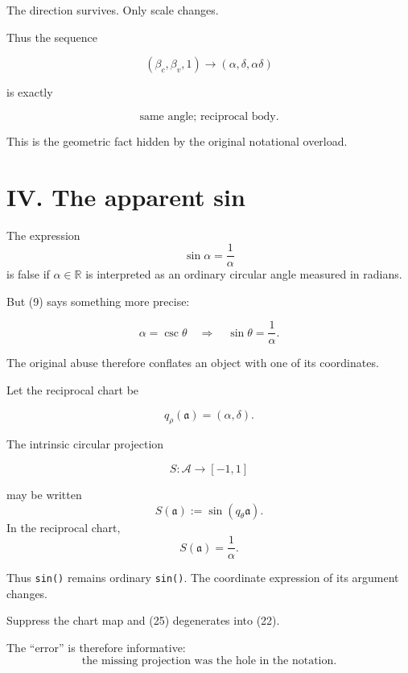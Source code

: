 \documentclass[9pt,twocolumn]{article}
\begin{document}
The direction survives. Only scale changes.

Thus the sequence

$$
(\beta_c,\beta_v,1)
\longrightarrow
(\alpha,\delta,\alpha\delta)
$$

is exactly

\begin{equation}
\boxed{\text{same angle; reciprocal body.}}
\tag{21}
\end{equation}

This is the geometric fact hidden by the original notational overload.

\section*{IV. The apparent sin}

The expression
\begin{equation}
\sin\alpha=\frac1\alpha
\tag{22}
\end{equation}
is false if $\alpha\in\mathbb R$ is interpreted as an ordinary circular angle measured in radians.

But (9) says something more precise:

\begin{equation}
\alpha=\csc\theta
\quad\Longrightarrow\quad
\sin\theta=\frac1\alpha.
\tag{23}
\end{equation}

The original abuse therefore conflates an object with one of its coordinates.

Let the reciprocal chart be

$$
q_\rho(\mathfrak a)=(\alpha,\delta).
$$

The intrinsic circular projection

$$
S:\mathcal A\rightarrow[-1,1]
$$

may be written
\begin{equation}
S(\mathfrak a)
:=
\sin(q_\theta\mathfrak a).
\tag{24}
\end{equation}
In the reciprocal chart,
\begin{equation}
\boxed{
S(\mathfrak a)=\frac1\alpha.
}
\tag{25}
\end{equation}

Thus \texttt{sin()} remains ordinary \texttt{sin()}. The coordinate expression of its argument changes.

Suppress the chart map and (25) degenerates into (22).

The ``error'' is therefore informative:
\begin{equation}
\boxed{
\text{the missing projection was the hole in the notation.}
}
\tag{26}
\end{equation}
\end{document}
